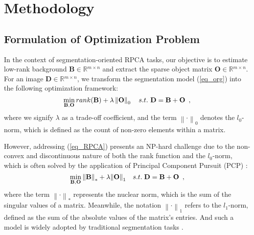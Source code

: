 \documentclass[10pt,journal,compsoc]{IEEEtran}
\begin{document}


\section{Methodology}
\label{sec:3}

\subsection{Formulation of Optimization Problem}
\label{sec:3.1}
In the context of segmentation-oriented RPCA tasks, our objective is to estimate low-rank background $\mathbf{B}\in \mathbb{R}{^{m \times n}}$ and extract the sparse object matrix $\mathbf{O}\in \mathbb{R}{^{m \times n}}$. For an image $\mathbf{D}\in \mathbb{R}{^{m \times n}}$, we transform the segmentation model (\ref{eq_org}) into the following optimization framework:
\begin{equation}
\setlength{\abovedisplayskip}{2pt}
\setlength{\belowdisplayskip}{2pt}
    \min \limits_{\mathbf{B},\mathbf{O}} rank(\mathbf{B}) + \lambda \left\| \mathbf{O} \right\|_0 \quad s.t.~\mathbf{D} = \mathbf{B} + \mathbf{O} \enspace,
\label{eq_RPCA}
\end{equation}
where we signify $\lambda$ as a trade-off coefficient, and the term ${\left\|  \cdot  \right\|_0}$ denotes the $l_0$-norm, which is defined as the count of non-zero elements within a matrix.

However, addressing (\ref{eq_RPCA}) presents an NP-hard challenge due to the non-convex and discontinuous nature of both the rank function and the $l_0$-norm, which is often solved by the application of Principal Component Pursuit (PCP) \cite{zhou-2010-pcp}:
\begin{equation}
\setlength{\abovedisplayskip}{2pt}
\setlength{\belowdisplayskip}{2pt}
    \mathop {\min }\limits_{\mathbf{B},\mathbf{O}} {\left\| \mathbf{B} \right\|_*} + \lambda {\left\| \mathbf{O} \right\|_1}\quad s.t.\;\mathbf{D} = \mathbf{B} + \mathbf{O} \enspace,
\label{eq_PCP}
\end{equation}
where the term $\left\| \cdot \right\|_*$ represents the nuclear norm, which is the sum of the singular values of a matrix. Meanwhile, the notation $\left\| \cdot \right\|_1$ refers to the $l_1$-norm, defined as the sum of the absolute values of the matrix's entries. And such a model is widely adopted by traditional segmentation tasks \cite{gao-2013-ipi,tang-2016-WLRR}.
\end{document}
